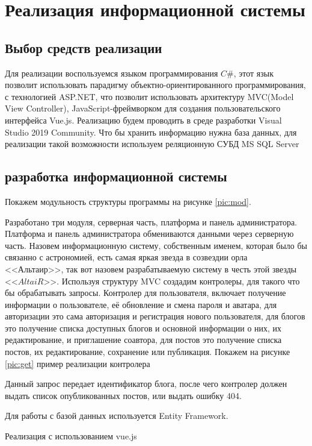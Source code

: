 \section{Реализация информационной системы}
\subsection{Выбор средств реализации}

Для реализации воспользуемся языком программирования $C\#$, этот язык позволит использовать парадигму объектно-ориентированного программирования, с технологией ASP.NET, что позволит использовать архитектуру MVC(Model View Controller), JavaScript-фреймворком для создания пользовательского интерфейса Vue.js. Реализацию будем проводить в среде разработки Visual Studio 2019 Community. Что бы хранить информацию нужна база данных, для реализации такой возможности используем реляционную СУБД MS SQL Server

\subsection{разработка информационной системы}

Покажем модульность структуры программы на рисунке \ref{pic:mod}.



Разработано три модуля, серверная часть, платформа и панель администратора. Платформа и панель администратора обмениваются данными через серверную часть. Назовем информационную систему, собственным именем, которая было бы связанно с астрономией, есть самая яркая звезда в созвездии орла <<Альтаир>>, так вот назовем разрабатываемую систему в честь этой звезды <<$AltaiR$>>. Используя структуру MVC создадим контролеры, для такого что бы обрабатывать запросы. Контролер для пользователя, включает получение информации о пользователе, её обновление и смена пароля и аватара, для авторизации это сама авторизация и регистрация нового пользователя, для блогов это получение списка доступных блогов и основной информации о них, их редактирование, и приглашение соавтора, для постов это получение списка постов, их редактирование, сохранение или публикация. Покажем на рисунке \ref{pic:get} пример реализации контролера


Данный запрос передает идентификатор блога, после чего контролер должен выдать список опубликованных постов, или выдать ошибку 404.

Для работы с базой данных используется Entity Framework.

Реализация с использованием vue.js 

\pagebreak